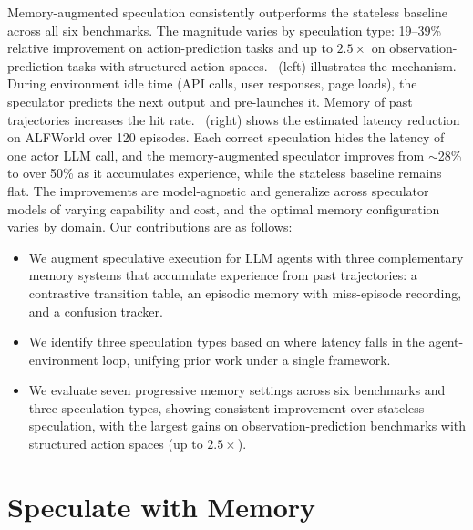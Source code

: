 \documentclass{article}
\begin{document}

Memory-augmented speculation consistently outperforms the stateless baseline across all six benchmarks. The magnitude varies by speculation type: 19--39\% relative improvement on action-prediction tasks and up to $2.5\times$ on observation-prediction tasks with structured action spaces. ~(left) illustrates the mechanism. During environment idle time (API calls, user responses, page loads), the speculator predicts the next output and pre-launches it. Memory of past trajectories increases the hit rate. ~(right) shows the estimated latency reduction on ALFWorld over 120 episodes. Each correct speculation hides the latency of one actor LLM call, and the memory-augmented speculator improves from $\sim$28\% to over 50\% as it accumulates experience, while the stateless baseline remains flat. The improvements are model-agnostic and generalize across speculator models of varying capability and cost, and the optimal memory configuration varies by domain. Our contributions are as follows:
\begin{itemize}[nosep,leftmargin=*]
    \item We augment speculative execution for LLM agents with three complementary memory systems that accumulate experience from past trajectories: a contrastive transition table, an episodic memory with miss-episode recording, and a confusion tracker.
    \item We identify three speculation types based on where latency falls in the agent-environment loop, unifying prior work under a single framework.
    \item We evaluate seven progressive memory settings across six benchmarks and three speculation types, showing consistent improvement over stateless speculation, with the largest gains on observation-prediction benchmarks with structured action spaces (up to $2.5\times$).
\end{itemize}


\section{Speculate with Memory}
\label{sec:method}
\end{document}
